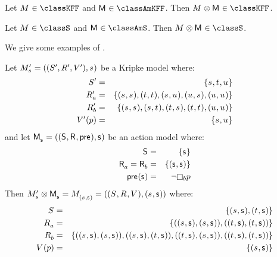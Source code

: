 \pagebreak

\begin{proposition}
    Let $\kModel \in \classKFF$ and $\aModel \in \classAmKFF$. Then $\kModel \exec \aModel \in \classKFF$.
\end{proposition}

\begin{proposition}
    Let $\kModel \in \classS$ and $\aModel \in \classAmS$. Then $\kModel \exec \aModel \in \classS$.
\end{proposition}

We give some examples of \logicAml{}.

\begin{example}\label{example-pal-ml}
Let $\kPModelAndTupleP{\kStateS}$ be a Kripke model where:
\begin{eqnarray*}
    \kStatesP &=& \{\kStateS, \kStateT, \kStateU\}\\
    \kAccessibilityPA &=& \{(\kStateS, \kStateS), (\kStateT, \kStateT), (\kStateS, \kStateU), (\kStateU, \kStateS), (\kStateU, \kStateU)\}\\
    \kAccessibilityPB &=& \{(\kStateS, \kStateS), (\kStateS, \kStateT), (\kStateT, \kStateS), (\kStateT, \kStateT), (\kStateU, \kStateU)\}\\
    \kValuationP(\atomP) &=& \{\kStateS, \kStateU\}
\end{eqnarray*}
and let $\aPModelAndTuple{\aStateS}$ be an action model where:
\begin{eqnarray*}
    \aStates &=& \{\aStateS\}\\
    \aAccessibilityA = \aAccessibilityB &=& \{(\aStateS, \aStateS)\}\\\
    \aPrecondition(\aStateS) &=& \lnot \knowsB \atomP
\end{eqnarray*}
Then $\kPModelP{\kStateS} \exec \aPModel{\aStateS} = \kPModelAndTuple{(\kStateS, \aStateS)}$ where:
\begin{eqnarray*}
    \kStates &=& \{(\kStateS, \aStateS), (\kStateT, \aStateS)\}\\
    \kAccessibilityA &=& \{((\kStateS, \aStateS), (\kStateS, \aStateS)), ((\kStateT, \aStateS), (\kStateT, \aStateS))\}\\
    \kAccessibilityB &=& \{((\kStateS, \aStateS), (\kStateS, \aStateS)), ((\kStateS, \aStateS), (\kStateT, \aStateS)), ((\kStateT, \aStateS), (\kStateS, \aStateS)), ((\kStateT, \aStateS), (\kStateT, \aStateS))\}\\
    \kValuation(\atomP) &=& \{(\kStateS, \aStateS)\}
\end{eqnarray*}


\end{example}
